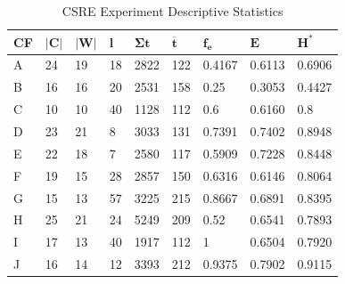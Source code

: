 \begin{table}[hbt]
  \caption[CSRE Experiment Descriptive Statistics]{CSRE Experiment Descriptive Statistics \autocite{Heil2019CSRECCIS}}
  \label{tbl:csre-statistics}
  \centering
    \begin{tabularx}{0.52\textwidth}{ ll l l l l l l l }
        \textbf{CF} & $\boldsymbol{|C|}$ & $\boldsymbol{|W|}$ & $\boldsymbol{l}$ & $\boldsymbol{\Sigma t}$ & $\boldsymbol{\overline{t}}$ & $\boldsymbol{f_e}$ & $\boldsymbol{E}$ & $\boldsymbol{H^{*}}$ \\ %
    \hline
    A & 24 & 19  & 18 & 2822 & 122 & 0.4167 & 0.6113 & 0.6906 \\ %
    B & 16 & 16  & 20 & 2531 & 158 & 0.25 & 0.3053 & 0.4427 \\ %
    C & 10 & 10  & 40 & 1128 & 112 & 0.6 &0.6160 & 0.8 \\ %
    D & 23 & 21  & 8  & 3033 & 131 & 0.7391 & 0.7402 & 0.8948 \\ %
    E & 22 & 18  & 7  & 2580 & 117 & 0.5909 & 0.7228 & 0.8448 \\ %
    F & 19 & 15  & 28 & 2857 & 150 & 0.6316 & 0.6146 & 0.8064 \\ %
    G & 15 & 13  & 57 & 3225 & 215 & 0.8667 & 0.6891 & 0.8395 \\ %
    H & 25 & 21  & 24 & 5249 & 209 & 0.52 & 0.6541 & 0.7893 \\ %
    I & 17 & 13  & 40 & 1917 & 112 & 1 & 0.6504 & 0.7920 \\ %
    J & 16 & 14  & 12 & 3393 & 212 & 0.9375 & 0.7902 & 0.9115 \\ %
    \hline
    \end{tabularx}
\end{table}

